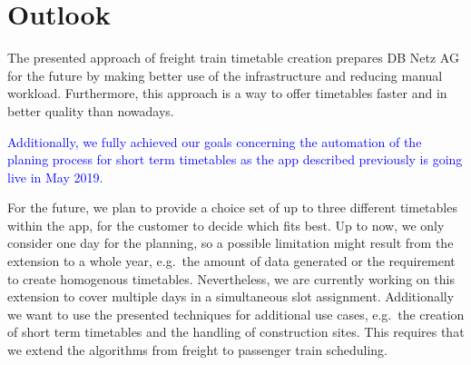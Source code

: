 \section{Outlook}
\label{chap:outlook}
The presented approach of freight train timetable creation prepares DB Netz AG for the future by making better use of the infrastructure and reducing manual workload. Furthermore, this approach is a way to offer timetables faster and in better quality than nowadays.

\textcolor{blue}{Additionally, we fully achieved our goals concerning the automation of the planing process for short term timetables as the app described previously is going live in May 2019.}

For the future, we plan to provide a choice set of up to three different timetables within the app, for the customer to decide which fits best. Up to now, we only consider one day for the planning, so a possible limitation might result from the extension to a whole year, e.g.\ the amount of data generated or the requirement to create homogenous timetables. Nevertheless, we are currently working on this extension to cover multiple days in a simultaneous slot assignment.
Additionally we want to use the presented techniques for additional use cases, e.g.\ the creation of short term timetables and the handling of construction sites. This requires that we extend the algorithms from freight to passenger train scheduling.